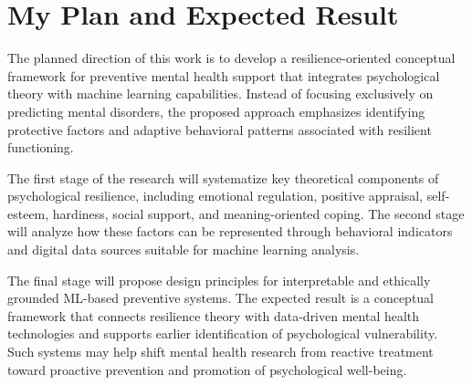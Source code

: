 \documentclass[conference]{IEEEtran}
\begin{document}
\section{My Plan and Expected Result}

The planned direction of this work is to develop a resilience-oriented conceptual framework for preventive mental health support that integrates psychological theory with machine learning capabilities. Instead of focusing exclusively on predicting mental disorders, the proposed approach emphasizes identifying protective factors and adaptive behavioral patterns associated with resilient functioning.

The first stage of the research will systematize key theoretical components of psychological resilience, including emotional regulation, positive appraisal, self-esteem, hardiness, social support, and meaning-oriented coping. The second stage will analyze how these factors can be represented through behavioral indicators and digital data sources suitable for machine learning analysis.

The final stage will propose design principles for interpretable and ethically grounded ML-based preventive systems. The expected result is a conceptual framework that connects resilience theory with data-driven mental health technologies and supports earlier identification of psychological vulnerability. Such systems may help shift mental health research from reactive treatment toward proactive prevention and promotion of psychological well-being.



\balance
\end{document}
